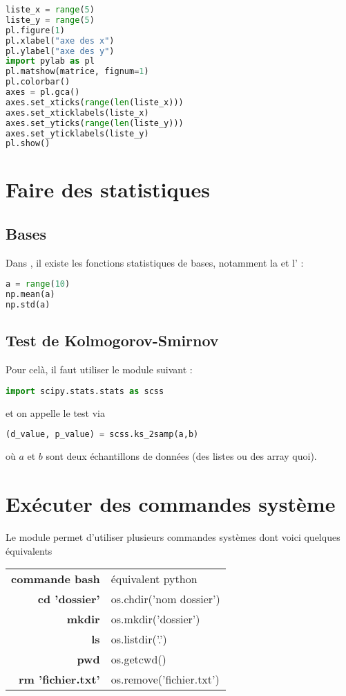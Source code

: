 \documentclass[a4paper,twoside]{article}
\begin{document}
\begin{lstlisting}[language=python]
liste_x = range(5)
liste_y = range(5)
pl.figure(1)
pl.xlabel("axe des x")
pl.ylabel("axe des y")
import pylab as pl
pl.matshow(matrice, fignum=1)
pl.colorbar()
axes = pl.gca()
axes.set_xticks(range(len(liste_x)))
axes.set_xticklabels(liste_x)
axes.set_yticks(range(len(liste_y)))
axes.set_yticklabels(liste_y)
pl.show()
\end{lstlisting}

\section{Faire des statistiques}
\subsection{Bases}
Dans , il existe les fonctions statistiques de bases, notamment la  et l' :
\begin{lstlisting}[language=python]
a = range(10)
np.mean(a)
np.std(a)
\end{lstlisting}



\subsection{Test de Kolmogorov-Smirnov}
Pour celà, il faut utiliser le module suivant :
\begin{lstlisting}[language=python]
import scipy.stats.stats as scss
\end{lstlisting}
et on appelle le test via
\begin{lstlisting}[language=python]
(d_value, p_value) = scss.ks_2samp(a,b)
\end{lstlisting}
où $a$ et $b$ sont deux échantillons de données (des listes ou des array quoi).





\section{Exécuter des commandes système}
Le module  permet d'utiliser plusieurs commandes systèmes dont voici quelques équivalents

\begin{tabular}{>{\bfseries}r<{}@{ : }p{11cm}}
commande bash & équivalent python\\
cd 'dossier' & os.chdir('nom dossier')\\
mkdir & os.mkdir('dossier')\\
ls & os.listdir('.')\\
pwd & os.getcwd()\\
rm 'fichier.txt' & os.remove('fichier.txt')
\end{tabular}
\end{document}
